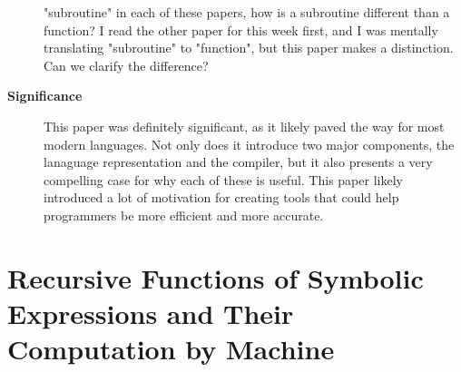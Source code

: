 \begin{description}
    "subroutine" in each of these papers, how is a subroutine different than a
    function? I read the other paper for this week first, and I was mentally
    translating "subroutine" to "function", but this paper makes a distinction.
    Can we clarify the difference?
    \item[\textbf{Significance}]
    This paper was definitely significant, as it likely paved the way for most
    modern languages. Not only does it introduce two major components, the
    lanaguage representation and the compiler, but it also presents a very
    compelling case for why each of these is useful. This paper likely
    introduced a lot of motivation for creating tools that could help
    programmers be more efficient and more accurate.
\end{description}

\section {Recursive Functions of Symbolic Expressions and Their Computation by
Machine \cite{mccarthy1959recursive}}

